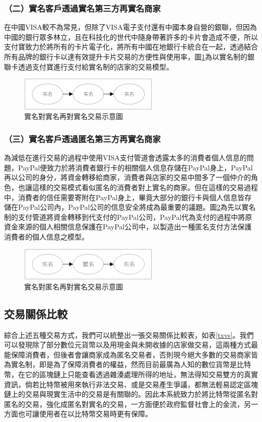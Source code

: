 		\subsubsection{（二）實名客戶透過實名第三方再實名商家}
		在中國VISA較不為常見，但除了VISA電子支付還有中國本身自營的銀聯，但因為中國的銀行眾多林立，且在科技化的世代中隨身帶著許多的卡片會造成不便，所以支付寶致力於將所有的卡片電子化，將所有中國在地銀行卡統合在一起，透過結合所有品牌的銀行卡以達有效提升卡片交易的方便性與使用率，圖\ref{modennn}為以實名制的銀聯卡透過支付寶進行支付給實名制的店家的交易模型。

		\begin{figure}[!htbp]
			\centering
			\includegraphics[width = 0.6\textwidth]{modennn.png}
			\caption{實名對實名再對實名交易示意圖}\label{modennn}
		\end{figure}

		\subsubsection{（三）實名客戶透過匿名第三方再實名商家}
		為減低在進行交易的過程中使用VISA支付管道會透露太多的消費者個人信息的問題，PayPal便致力於將消費者銀行卡的相關個人信息存儲在PayPal身上，PayPal再以公司的身分，將資金轉移給商家，消費者與店家的交易中間多了一個仲介的角色，也讓這樣的交易模式看似匿名的消費者對上實名的商家。但在這樣的交易過程中，消費者的信任需要寄附在PayPal身上，畢竟大部分的銀行卡與個人信息皆存儲在PayPal公司內，PayPal公司的信息安全將成為最重要的議題。圖\ref{modenan}為先以實名制的支付管道將資金轉移到代支付的PayPal公司，PayPal代為支付的過程中將原資金來源的個人相關信息保護在PayPal公司中，以製造出一種匿名支付方法保護消費者的個人信息之模型。

		\begin{figure}[!htbp]
			\centering
			\includegraphics[width = 0.6\textwidth]{modenan.png}
			\caption{實名對匿名再對實名交易示意圖}\label{modenan}
		\end{figure}

		\subsection{交易關係比較}
		綜合上述五種交易方式，我們可以統整出一張交易關係比較表，如表\ref{txvs}。我們可以發現除了部分數位元貨幣以及用現金與未開收據的店家做交易，這兩種方式最能保障消費者，但後者會讓商家成為匿名交易者，否則現今絕大多數的交易商家皆為實名制，即是為了保障消費者的權益，然而目前最廣為人知的數位貨幣是比特幣，在它的區塊鏈上只能查看透過雜湊處理所得的地址，無法得知交易雙方的真實資訊，倘若比特幣被用來執行非法交易、或是交易產生爭議，都無法輕易認定區塊鏈上的交易與現實生活中的交易是有關聯的。因此本系統致力於將比特幣從匿名對匿名的交易，強化成匿名對實名的交易，一方面便於政府監督社會上的金流，另一方面也可讓使用者在以比特幣交易時更有保障。

